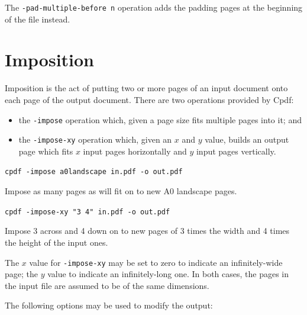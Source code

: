 \documentclass{book}
\begin{document}
\noindent The \texttt{-pad-multiple-before n} operation adds the padding pages at the beginning of the file  instead.


\section{Imposition}


Imposition is the act of putting two or more pages of an input document onto each page of the output document. There are two operations provided by Cpdf:

\begin{itemize}
\item the \texttt{-impose} operation which, given a page size fits multiple pages into it; and
\item the \texttt{-impose-xy} operation which, given an $x$ and $y$ value, builds an output page which fits $x$ input pages horizontally and $y$ input pages vertically. \end{itemize}

  \begin{framed}
    \noindent\small\verb!cpdf -impose a0landscape in.pdf -o out.pdf!
 
    \vspace{2.5mm}
    \noindent Impose as many pages as will fit on to new A0 landscape pages. 

    \vspace{2.5mm}
    \noindent\small\verb!cpdf -impose-xy "3 4" in.pdf -o out.pdf!
 
    \vspace{2.5mm}
    \noindent Impose 3 across and 4 down on to new pages of 3 times the width and 4 times the height of the input ones. 
  \end{framed}

\noindent The $x$ value for \texttt{-impose-xy} may be set to zero to indicate an infinitely-wide page; the $y$ value to indicate an infinitely-long one. In both cases, the pages in the input file are assumed to be of the same dimensions.

The following options may be used to modify the output:
\end{document}
